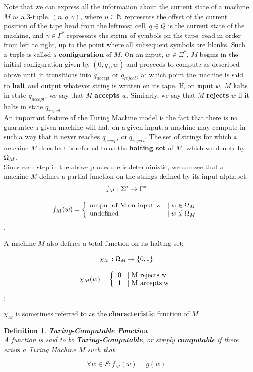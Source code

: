 \documentclass{article}
\newtheorem{definition}{Definition}[section]
\begin{document}
Note that we can express all the information about the current state
of a machine $M$ as a 3-tuple, $(n, q, \gamma)$, where $n \in
\mathbb{N}$ represents the offset of the current position of the tape
head from the leftmost cell, $q \in Q$ is the current state of the
machine, and $\gamma \in \Gamma^*$ represents the string of symbols
on the tape, read in order from left to right, up to the point where
all subsequent symbols are blanks.  Such a tuple is called a
\textbf{configuration} of $M$. On an input, $w \in \Sigma^*$, $M$
begins in the initial configuration given by $(0, q_0, w)$ and
proceeds to compute as described above until it transitions into
$q_{accept}$ or $q_{reject}$, at which point the machine is said to
\textbf{halt} and output whatever string is written on its tape.
If, on input $w$, $M$ halts in state $q_{accept}$, we say that $M$
\textbf{accepts} $w$.  Similarly, we say that $M$ \textbf{rejects}
$w$ if it halts in state $q_{reject}.$ \\

An important feature of the Turing Machine model is the fact that
there is no guarantee a given machine will halt on a given input; a
machine may compute in such a way that it never reaches $q_{accept}$
or $q_{reject}$. The set of strings for which a machine $M$ does halt
is referred to as the \textbf{halting set} of $M$, which we denote
by $\Omega_M$.\\

Since each step in the above procedure is deterministic, we can see
that a machine $M$ defines a partial function on the strings
defined by its input alphabet:
$$f_M:\Sigma^* \rightarrow \Gamma^*$$

$$f_M(w) = \left\{ \begin{array}{ll} \textnormal{output of M on input w} & \mid w \in \Omega_M \\ \textnormal{undefined} & \mid w \notin \Omega_M \end{array} \right.$$.
\newline

A machine $M$ also defines a total function on its halting set:

$$\chi_M:\Omega_M \rightarrow \{0,1\}$$

$$\chi_M(w) = \left\{ \begin{array}{ll} 0 & \mid \textnormal{M rejects w} \\ 1 & \mid \textnormal{M accepts w} \end{array} \right.$$;

$\chi_M$ is sometimes referred to as the \textbf{characteristic} function of $M$.\\

\begin{definition}{\textbf{Turing-Computable Function}}\\

  A function  is said to be
  \textbf{Turing-Computable}, or simply \textbf{computable} if there
  exists a Turing Machine $M$ such that
  
  $$\forall w \in S: f_M(w) = g(w)$$
  
\end{definition}
\end{document}
